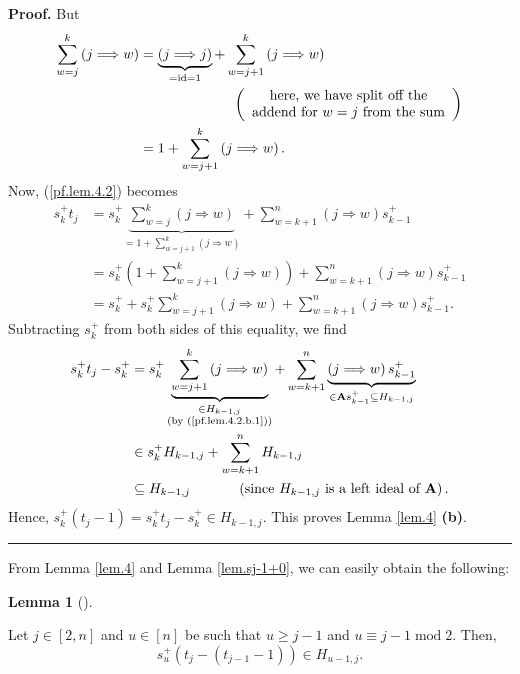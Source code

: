 \documentclass[numbers=enddot,12pt,final,onecolumn,notitlepage]{scrartcl}%
\theoremstyle{definition}
\newtheorem{lem}[theo]{Lemma}
\newenvironment{lemma}[1][]
{\begin{lem}[#1]\begin{leftbar}}
{\end{leftbar}\end{lem}}
\newenvironment{proof}[1][Proof]{\noindent\textbf{#1.} }{\ \rule{0.5em}{0.5em}}
\let\sumnonlimits\sum
\renewcommand{\sum}{\sumnonlimits\limits}
\begin{document}
\begin{proof}
But%
\begin{align*}
\sum_{w=j}^{k}\left(  j\Longrightarrow w\right)   &  =\underbrace{\left(
j\Longrightarrow j\right)  }_{=\operatorname*{id}=1}+\sum_{w=j+1}^{k}\left(
j\Longrightarrow w\right) \\
&  \ \ \ \ \ \ \ \ \ \ \ \ \ \ \ \ \ \ \ \ \left(
\begin{array}
[c]{c}%
\text{here, we have split off the}\\
\text{addend for }w=j\text{ from the sum}%
\end{array}
\right) \\
&  =1+\sum_{w=j+1}^{k}\left(  j\Longrightarrow w\right)  .
\end{align*}
Now, (\ref{pf.lem.4.2}) becomes%
\begin{align*}
s_{k}^{+}t_{j}  &  =s_{k}^{+}\underbrace{\sum_{w=j}^{k}\left(
j\Longrightarrow w\right)  }_{=1+\sum_{w=j+1}^{k}\left(  j\Longrightarrow
w\right)  }+\sum_{w=k+1}^{n}\left(  j\Longrightarrow w\right)  s_{k-1}^{+}\\
&  =s_{k}^{+}\left(  1+\sum_{w=j+1}^{k}\left(  j\Longrightarrow w\right)
\right)  +\sum_{w=k+1}^{n}\left(  j\Longrightarrow w\right)  s_{k-1}^{+}\\
&  =s_{k}^{+}+s_{k}^{+}\sum_{w=j+1}^{k}\left(  j\Longrightarrow w\right)
+\sum_{w=k+1}^{n}\left(  j\Longrightarrow w\right)  s_{k-1}^{+}.
\end{align*}
Subtracting $s_{k}^{+}$ from both sides of this equality, we find%
\begin{align*}
s_{k}^{+}t_{j}-s_{k}^{+}  &  =s_{k}^{+}\underbrace{\sum_{w=j+1}^{k}\left(
j\Longrightarrow w\right)  }_{\substack{\in H_{k-1,j}\\\text{(by
(\ref{pf.lem.4.2.b.1}))}}}+\sum_{w=k+1}^{n}\underbrace{\left(
j\Longrightarrow w\right)  s_{k-1}^{+}}_{\in\mathbf{A}s_{k-1}^{+}\subseteq
H_{k-1,j}}\\
&  \in s_{k}^{+}H_{k-1,j}+\sum_{w=k+1}^{n}H_{k-1,j}\\
&  \subseteq H_{k-1,j}\ \ \ \ \ \ \ \ \ \ \left(  \text{since }H_{k-1,j}\text{
is a left ideal of }\mathbf{A}\right)  .
\end{align*}
Hence, $s_{k}^{+}\left(  t_{j}-1\right)  =s_{k}^{+}t_{j}-s_{k}^{+}\in
H_{k-1,j}$. This proves Lemma \ref{lem.4} \textbf{(b)}.
\end{proof}

From Lemma \ref{lem.4} and Lemma \ref{lem.sj-1+0}, we can easily obtain the following:

\begin{lemma}
\label{lem.4+0}Let $j\in\left[  2,n\right]  $ and $u\in\left[  n\right]  $ be
such that $u\geq j-1$ and $u\equiv j-1\operatorname{mod}2$. Then,%
\[
s_{u}^{+}\left(  t_{j}-\left(  t_{j-1}-1\right)  \right)  \in H_{u-1,j}.
\]

\end{lemma}
\end{document}
